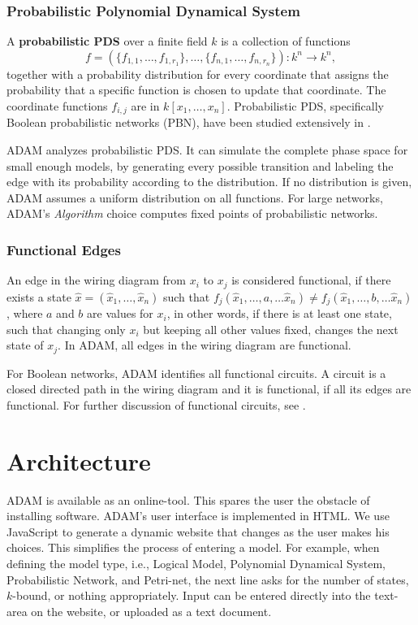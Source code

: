 \documentclass[11pt]{amsart}
\begin{document}
\subsubsection{Probabilistic Polynomial Dynamical System}
A {\bf probabilistic PDS} over a finite field $k$ is a collection of functions
$$f = (\{f_{1,1}, \ldots, f_{1, r_1}\}, \ldots, \{f_{n, 1}, \ldots, f_{n, r_n}
\}) : k^n \rightarrow k^n,$$ 
together with a probability distribution for every coordinate that assigns the
probability that a specific function is chosen to update that coordinate. 
The coordinate functions $f_{i,j}$ are in $k[x_1, \ldots , x_n]$. 
Probabilistic PDS, specifically Boolean probabilistic networks (PBN), have been studied
extensively in \cite{shmulevich}. 

ADAM analyzes probabilistic PDS. It can simulate the
complete phase space for small enough models, by generating every possible
transition and labeling the edge with its probability according to the
distribution. If no distribution is given, ADAM assumes a uniform distribution
on all functions. For large networks, ADAM's {\it Algorithm} choice computes
fixed points of probabilistic networks.


\subsubsection{Functional Edges}
An edge in the wiring diagram from $x_i$ to $x_j$ is considered
functional, if there exists a state $\hat x = (\hat x_1,  \ldots, \hat x_n)$ such
that $f_j( \hat x_1,  \ldots, a, \ldots \hat x_n) \neq f_j(\hat x_1, \ldots, b, \ldots
\hat x_n)$, where $a$ and $b$ are values for $x_i$, in other words, if there
is at least one state, such that changing only $x_i$ but keeping all other
values fixed, changes the next state of $x_j$. 
In ADAM, all edges in the wiring diagram are functional. 

For Boolean networks, ADAM identifies all functional circuits. A circuit is a
closed directed path in the wiring diagram and it is functional, if all its
edges are functional. For further discussion of
functional circuits, see \cite{Chaouiya}. 


\section{Architecture}
ADAM is available as an online-tool. This spares the user the obstacle of installing software. ADAM's user interface is implemented in HTML. We use JavaScript to generate a dynamic website that changes as the user makes his choices. This simplifies the process of entering a model. For example, when defining the model type, i.e., Logical Model, Polynomial Dynamical System, Probabilistic Network, and Petri-net, the next line asks for the number of states, $k$-bound, or nothing appropriately. Input can be entered directly into the text-area on the website, or uploaded as a text document. 
\end{document}
